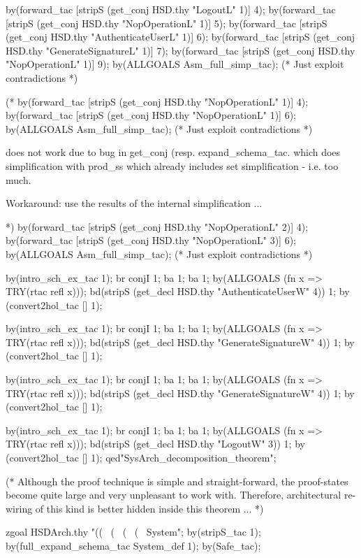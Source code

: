 \documentclass[a4paper,pdftex]{article}
\newenvironment{holz-ml}{\comment}{\endcomment}
\begin{document}
\begin{holz-ml}
by(forward_tac [stripS (get_conj HSD.thy "LogoutL" 1)] 4);
by(forward_tac [stripS (get_conj HSD.thy "NopOperationL" 1)] 5);
by(forward_tac [stripS (get_conj HSD.thy "AuthenticateUserL" 1)] 6);
by(forward_tac [stripS (get_conj HSD.thy "GenerateSignatureL" 1)] 7);
by(forward_tac [stripS (get_conj HSD.thy "NopOperationL" 1)] 9);
by(ALLGOALS Asm_full_simp_tac); (* Just exploit contradictions *)

(*
by(forward_tac [stripS (get_conj HSD.thy "NopOperationL" 1)] 4);
by(forward_tac [stripS (get_conj HSD.thy "NopOperationL" 1)] 6);
by(ALLGOALS Asm_full_simp_tac); (* Just exploit contradictions *)

does not work due to bug in get_conj (resp. expand_schema_tac.
which does simplification with prod_ss which already includes
set simplification - i.e. too much. 

Workaround: use the results of the internal simplification ... 

*)
by(forward_tac [stripS (get_conj HSD.thy "NopOperationL" 2)] 4);
by(forward_tac [stripS (get_conj HSD.thy "NopOperationL" 3)] 6);
by(ALLGOALS Asm_full_simp_tac); (* Just exploit contradictions *)

by(intro_sch_ex_tac 1);
br conjI 1; ba 1; ba 1; 
by(ALLGOALS (fn x => TRY(rtac refl x)));
bd(stripS (get_decl HSD.thy "AuthenticateUserW" 4)) 1; 
by (convert2hol_tac [] 1); 

by(intro_sch_ex_tac 1);
br conjI 1; ba 1; ba 1; 
by(ALLGOALS (fn x => TRY(rtac refl x)));
bd(stripS (get_decl HSD.thy "GenerateSignatureW" 4)) 1; 
by (convert2hol_tac [] 1); 

by(intro_sch_ex_tac 1);
br conjI 1; ba 1; ba 1; 
by(ALLGOALS (fn x => TRY(rtac refl x)));
bd(stripS (get_decl HSD.thy "GenerateSignatureW" 4)) 1; 
by (convert2hol_tac [] 1); 

by(intro_sch_ex_tac 1);
br conjI 1; ba 1; ba 1; 
by(ALLGOALS (fn x => TRY(rtac refl x)));
bd(stripS (get_decl HSD.thy "LogoutW" 3)) 1; 
by (convert2hol_tac [] 1); 
qed"SysArch_decomposition_theorem";
          
(* Although the proof technique is simple and straight-forward, the 
   proof-states become quite large and very unpleasant to work with.
   Therefore, architectural re-wiring of this kind is better hidden
   inside this theorem ... *)



zgoal HSDArch.thy 
"((%
\ (%
\ (%
\ (%
\ System";
by(stripS_tac 1);
by(full_expand_schema_tac System_def 1);
by(Safe_tac);


\end{holz-ml}
\end{document}
